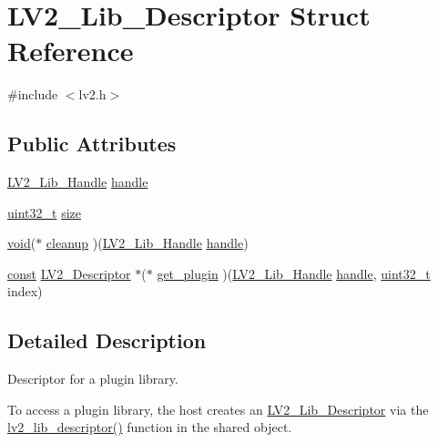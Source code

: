 \hypertarget{struct_l_v2___lib___descriptor}{}\section{L\+V2\+\_\+\+Lib\+\_\+\+Descriptor Struct Reference}
\label{struct_l_v2___lib___descriptor}


{\ttfamily \#include $<$lv2.\+h$>$}

\subsection*{Public Attributes}
\begin{DoxyCompactItemize}
\item 
\hyperlink{lv2_8h_ab3e00ef0fdee31fc81a650793a780221}{L\+V2\+\_\+\+Lib\+\_\+\+Handle} \hyperlink{struct_l_v2___lib___descriptor_a7b1ff54c9aee9c7316df940fda237b4a}{handle}
\item 
\hyperlink{lib-src_2ffmpeg_2win32_2stdint_8h_a6eb1e68cc391dd753bc8ce896dbb8315}{uint32\+\_\+t} \hyperlink{struct_l_v2___lib___descriptor_a4dc5b75a470b8d3c595d5e7621898e7d}{size}
\item 
\hyperlink{sound_8c_ae35f5844602719cf66324f4de2a658b3}{void}($\ast$ \hyperlink{struct_l_v2___lib___descriptor_af74270275ff1c5931ef2ab8a57f77065}{cleanup} )(\hyperlink{lv2_8h_ab3e00ef0fdee31fc81a650793a780221}{L\+V2\+\_\+\+Lib\+\_\+\+Handle} \hyperlink{struct_l_v2___lib___descriptor_a7b1ff54c9aee9c7316df940fda237b4a}{handle})
\item 
\hyperlink{getopt1_8c_a2c212835823e3c54a8ab6d95c652660e}{const} \hyperlink{lv2_8h_ac9db79f137f126ef10ef707b6de85a78}{L\+V2\+\_\+\+Descriptor} $\ast$($\ast$ \hyperlink{struct_l_v2___lib___descriptor_a6c29de06901b337df58d9e95b94c95fb}{get\+\_\+plugin} )(\hyperlink{lv2_8h_ab3e00ef0fdee31fc81a650793a780221}{L\+V2\+\_\+\+Lib\+\_\+\+Handle} \hyperlink{struct_l_v2___lib___descriptor_a7b1ff54c9aee9c7316df940fda237b4a}{handle}, \hyperlink{lib-src_2ffmpeg_2win32_2stdint_8h_a6eb1e68cc391dd753bc8ce896dbb8315}{uint32\+\_\+t} index)
\end{DoxyCompactItemize}


\subsection{Detailed Description}
Descriptor for a plugin library.

To access a plugin library, the host creates an \hyperlink{struct_l_v2___lib___descriptor}{L\+V2\+\_\+\+Lib\+\_\+\+Descriptor} via the \hyperlink{lv2_8h_a9eb5804c670849d3faafed9f9cd65f23}{lv2\+\_\+lib\+\_\+descriptor()} function in the shared object. 

